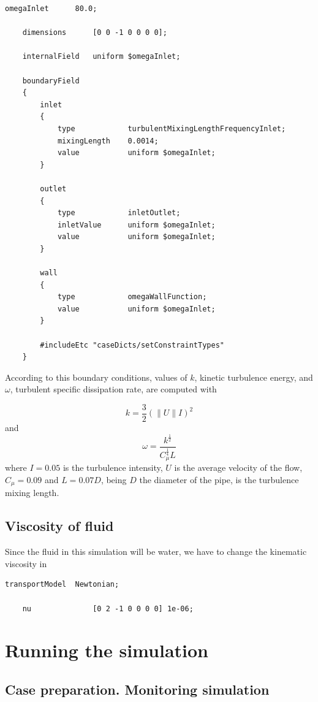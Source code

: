 \documentclass[
    parskip=half,      %
    DIV=12,            %
    headings=normal,   %
    fontsize=11pt,     %
    english            %
]{scrartcl}
\begin{document}
\begin{lstlisting}[style=openfoam]
	omegaInlet      80.0;
	
	dimensions      [0 0 -1 0 0 0 0];
	
	internalField   uniform $omegaInlet;
	
	boundaryField
	{
		inlet
		{
			type            turbulentMixingLengthFrequencyInlet;
			mixingLength    0.0014;
			value           uniform $omegaInlet;
		}
		
		outlet
		{
			type            inletOutlet;
			inletValue      uniform $omegaInlet;
			value           uniform $omegaInlet;
		}
		
		wall
		{
			type            omegaWallFunction;
			value           uniform $omegaInlet;
		}
		
		#includeEtc "caseDicts/setConstraintTypes"
	}
\end{lstlisting}

According to this boundary conditions, values of $k$, kinetic turbulence energy, and 
$\omega$, turbulent specific dissipation rate, are computed with

\begin{equation}
	k = \frac{3}{2} \left(\|U\| I\right)^2
\end{equation}
and
\begin{equation}
	\omega = \frac{k^\frac{1}{2}}{C_\mu^\frac{1}{4}L}
\end{equation}
where $I=0.05$ is the turbulence intensity, $U$ is the average velocity of the flow, 
$C_\mu = 0.09$ and $L=0.07D$, being $D$ the diameter of the pipe, is the 
turbulence mixing length. 

\subsection{Viscosity of fluid}

Since the fluid in this simulation will be water, we have to change the  kinematic 
viscosity in 

\begin{lstlisting}[style=openfoam]
	transportModel  Newtonian;
	
	nu              [0 2 -1 0 0 0 0] 1e-06;
\end{lstlisting}
\section{Running the simulation}

\subsection{Case preparation. Monitoring simulation}
\end{document}
